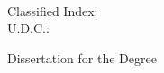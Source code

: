 {\begin{titlepage}

  \ifoneortwoside
    \newpage
    ~~~\vspace{1em}
    \thispagestyle{empty}
  \fi

\ifxueweimaster
    \newpage
    \thispagestyle{empty}
    \begin{center}
    \parbox[t][0.6cm][t]{\textwidth}{
    \begin{center} \end{center}}

    \parbox[t][2.2cm][t]{\textwidth}{
    \xiaosi Classified Index: \@natclassifiedindex \\
                  U.D.C.:  \@internatclassifiedindex }

    \parbox[t][2.7cm][b]{\textwidth}{\xiaoer
    \begin{center} {  Dissertation for the {\exueweier} Degree }\end{center} } %


\end{center}
\end{titlepage}}

